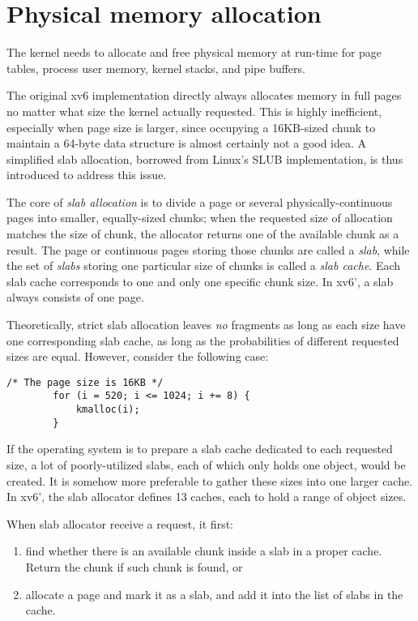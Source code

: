 \documentclass{report}
\def \hilite#1{\textcolor{red}{#1}}
\newenvironment{hilight}{\color{red}}{\color{black}}
\begin{document}
	\section{Physical memory allocation}
	The kernel needs to allocate and free physical memory at run-time for page tables, 
	process user memory, kernel stacks, and pipe buffers.
	
	\begin{hilight}
		\marginpar{
			\footnotesize\ttfamily
			\hilite{
				kern/mm/slab.c\\
				include/mm/slab.h
			}
		}
		The original xv6 implementation directly always allocates memory in full pages no matter what size the kernel
		actually requested.  This is highly inefficient, especially when page size is larger, since occupying a
		16KB-sized chunk to maintain a 64-byte data structure is almost certainly not a good idea.  A simplified
		slab allocation, borrowed from Linux's SLUB implementation, is thus introduced to address this issue.
		
		The core of \emph{slab allocation} is to divide a page or several physically-continuous pages into smaller, 
		equally-sized chunks; when the requested size of allocation matches the size of chunk, the allocator returns
		one of the available chunk as a result.  The page or continuous pages storing those chunks are called a
		\emph{slab}, while the set of \emph{slabs} storing one particular size of chunks is called a
		\emph{slab cache}.  Each slab cache corresponds to one and only one specific chunk size.  In xv6', a slab
		always consists of one page.
		
		Theoretically, strict slab allocation leaves \emph{no} fragments as long as each size have one
		corresponding slab cache, as long as the probabilities of different requested sizes are equal.
		However, consider the following case:
		\begin{lstlisting}[style=c]
		/* The page size is 16KB */
		for (i = 520; i <= 1024; i += 8) {
			kmalloc(i);
		}
		\end{lstlisting}
		If the operating system is to prepare a slab cache dedicated to each requested size, a lot of
		poorly-utilized slabs, each of which only holds one object, would be created.  It is somehow more
		preferable to gather these sizes into one larger cache.  In xv6', the slab allocator defines 13
		caches, each to hold a range of object sizes.
		
		When slab allocator receive a request, it first:
		\begin{enumerate}
			\item find whether there is an available chunk inside a slab in a proper cache.  Return the chunk
			if such chunk is found, or
			\item allocate a page and mark it as a slab, and add it into the list of slabs in the cache.
		\end{enumerate}
		

\end{hilight}
\end{document}
